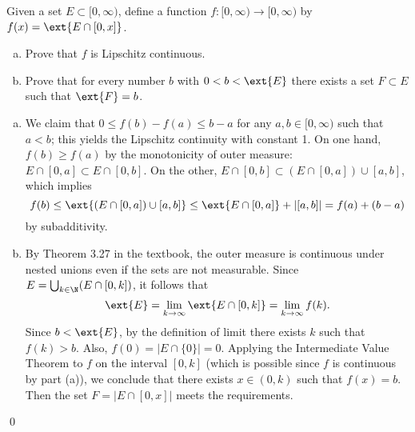 \begin{hwsol}
Given a set $E \subset [0, \infty)$, define a function $f: [0, \infty) \to [0, \infty)$ by $f(x)= \ext{E\cap [0, x]}$. 
	\begin{enumerate}[(a)]
	\item Prove that $f$ is Lipschitz continuous.
	\item Prove that for every number $b$ with $0< b< \ext{E}$ there exists a set $F \subset E$ such that $\ext{F}=b$.
	\end{enumerate}

\pf 
\begin{enumerate}[(a)]
\item We claim that $0 \leq f(b)-f(a) \leq b-a$ for any $a,b \in [0, \infty)$ such that $a<b$; this yields the Lipschitz continuity with constant 1. On one hand, $f(b) \geq f(a)$ by the monotonicity of outer measure: $E \cap [0, a] \subset E \cap [0, b]$. On the other, $ E \cap [0, b] \subset (E \cap [0, a]) \cup [a, b]$, which implies
        \[
        f(b) \leq \ext{(E \cap [0, a]) \cup [a, b]} \leq \ext{E \cap [0, a]} + |[a, b]|= f(a) + (b-a)
        \]
by subadditivity. 

\item By Theorem 3.27 in the textbook, the outer measure is continuous under nested unions even if the sets are not measurable. Since $E=\bigcup_{k \in \N} (E \cap [0, k])$, it follows that
        \[
        \ext{E}= \lim_{k \to \infty} \ext{E\cap [0, k]}= \lim_{k \to \infty} f(k).
        \]
Since $b< \ext{E}$, by the definition of limit there exists $k$ such that $f(k)>b$. Also, $f(0)= |E \cap \{0\}|= 0$. Applying the Intermediate Value Theorem to $f$ on the interval $[0, k]$ (which is possible since $f$ is continuous by part (a)), we conclude that there exists $x \in (0, k)$ such that $f(x)=b$. Then the set $F=|E \cap [0, x]|$ meets the requirements. 
\end{enumerate} \qed \\
\end{hwsol}


